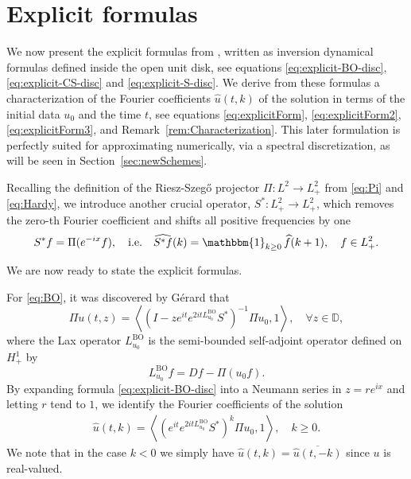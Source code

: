 \documentclass [11pt] {article}
\begin{document}
\section{Explicit formulas}\label{sec:explForm}

We now present the explicit formulas from \cite{G, Bad24,GG15}, written as inversion dynamical formulas defined inside the open unit disk, see equations \eqref{eq:explicit-BO-disc}, \eqref{eq:explicit-CS-disc} and  \eqref{eq:explicit-S-disc}. We derive from these formulas
a characterization of the Fourier coefficients $\widehat{u}(t,k)$ of the solution in terms of the initial data $u_0$ and the time $t$, see equations \eqref{eq:explicitForm}, \eqref{eq:explicitForm2}, \eqref{eq:explicitForm3}, and Remark~\ref{rem:Characterization}.
This later formulation is perfectly suited for approximating numerically, via a spectral discretization, as will be seen in Section~\ref{sec:newSchemes}.

Recalling the definition of the Riesz-Szeg\H o projector $\Pi:L^2 \rightarrow L^2_{+}$ from \eqref{eq:Pi} and \eqref{eq:Hardy}, we introduce another crucial operator, $S^*:L^2_+ \rightarrow L^2_{+}$,
which removes the zero-th Fourier coefficient and shifts all positive frequencies by one
\[
S^*f = \Pi(e^{-ix}f), \quad\text{i.e.}\quad \widehat{S^*f}(k)=\mathbbm{1}_{k\geq 0}\,\widehat{f}(k+1),\quad f \in L^2_{+}.
\]

We are now ready to state the explicit formulas.

For \eqref{eq:BO}, it was discovered by Gérard \cite[Theorem 4]{G} that
\begin{equation}
\label{eq:explicit-BO-disc}
\Pi u(t, z)=\left\langle\left(I-z e^{i t} e^{2 i t L_{u_0}^{\text{BO}}} S^*\right)^{-1} \Pi u_0, 1\right\rangle, \quad \forall z \in \mathbb{D},
\end{equation}
where the Lax operator $L_{u_0}^{\text{BO}}$ is the semi-bounded self-adjoint operator defined on $H^1_{+}$ by
\[
 L_{u_0}^{\text{BO}}f = Df - \Pi(u_0f).
\]
By expanding formula \eqref{eq:explicit-BO-disc} into a Neumann series in $z=re^{ix}$
and letting $r$ tend to $1$,
we identify the Fourier coefficients of the solution
\begin{align}\label{eq:explicitForm}
\widehat{u}(t,k) =\left\langle (e^{it}e^{2itL_{u_0}^{\text{BO}}}S^{*})^k \Pi u_0, 1 \right\rangle, \quad k \ge 0.
\end{align}
We note that in the case $k<0$ we simply have $\widehat{u}(t,k) = \overline{\widehat{u}(t,-k)}$ since $u$ is real-valued.
\end{document}
